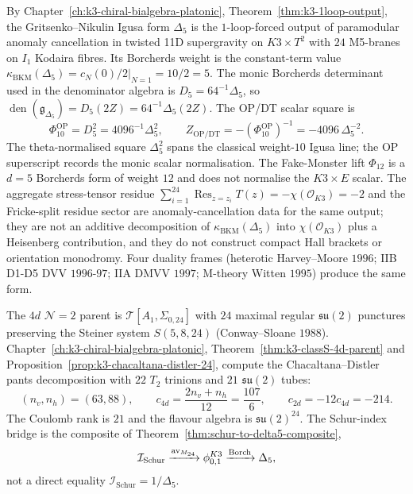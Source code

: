 \begin{remark}
\label{rem:k3e-cy3-platonic-one-loop}
By Chapter~\ref{ch:k3-chiral-bialgebra-platonic}, Theorem~\ref{thm:k3-1loop-output}, the Gritsenko--Nikulin Igusa form $\Delta_5$ is the $1$-loop-forced output of paramodular anomaly cancellation in twisted 11D supergravity on $K3\times T^2$ with $24$ M5-branes on $I_1$ Kodaira fibres. Its Borcherds weight is the constant-term value $\kappa_{\mathrm{BKM}}(\Delta_5)=\left.c_N(0)/2\right|_{N=1}=10/2=5$. The monic Borcherds determinant used in the denominator algebra is $D_5=64^{-1}\Delta_5$, so $\operatorname{den}(\mathfrak g_{\Delta_5})=D_5(2Z)=64^{-1}\Delta_5(2Z)$. The OP/DT scalar square is
\[
 \Phi_{10}^{\mathrm{OP}}=D_5^2=4096^{-1}\Delta_5^2,\qquad
 Z_{\mathrm{OP/DT}}=-(\Phi_{10}^{\mathrm{OP}})^{-1}
 =-4096\,\Delta_5^{-2}.
\]
The theta-normalised square $\Delta_5^2$ spans the classical weight-$10$ Igusa line; the OP superscript records the monic scalar normalisation. The Fake-Monster lift $\Phi_{12}$ is a $d=5$ Borcherds form of weight $12$ and does not normalise the $K3\times E$ scalar. The aggregate stress-tensor residue $\sum_{i=1}^{24}\operatorname{Res}_{z=z_i}T(z)=-\chi(\mathcal{O}_{K3})=-2$ and the Fricke-split residue sector are anomaly-cancellation data for the same output; they are not an additive decomposition of $\kappa_{\mathrm{BKM}}(\Delta_5)$ into $\chi(\mathcal{O}_{K3})$ plus a Heisenberg contribution, and they do not construct compact Hall brackets or orientation monodromy. Four duality frames (heterotic Harvey--Moore $1996$; IIB D1-D5 DVV $1996$-$97$; IIA DMVV $1997$; M-theory Witten $1995$) produce the same form.
\end{remark}

\begin{remark}
\label{rem:k3e-cy3-platonic-classS}
The $4d$ $\mathcal{N}=2$ parent is $\mathcal{T}[A_1,\Sigma_{0,24}]$ with $24$ maximal regular $\mathfrak{su}(2)$ punctures preserving the Steiner system $S(5,8,24)$ (Conway--Sloane $1988$). Chapter~\ref{ch:k3-chiral-bialgebra-platonic}, Theorem~\ref{thm:k3-classS-4d-parent} and Proposition~\ref{prop:k3-chacaltana-distler-24}, compute the Chacaltana--Distler pants decomposition with $22$ $T_2$ trinions and $21$ $\mathfrak{su}(2)$ tubes:
\[
 (n_v,n_h)=(63,88),\qquad
 c_{4d}=\frac{2n_v+n_h}{12}=\frac{107}{6},\qquad
 c_{2d}=-12c_{4d}=-214.
\]
The Coulomb rank is $21$ and the flavour algebra is $\mathfrak{su}(2)^{24}$. The Schur-index bridge is the composite of Theorem~\ref{thm:schur-to-delta5-composite},
\[
 \mathcal I_{\mathrm{Schur}}
 \xrightarrow{\mathrm{av}_{M_{24}}}
 \phi_{0,1}^{K3}
 \xrightarrow{\operatorname{Borch}}
 \Delta_5,
\]
not a direct equality $\mathcal I_{\mathrm{Schur}}=1/\Delta_5$.
\end{remark}

